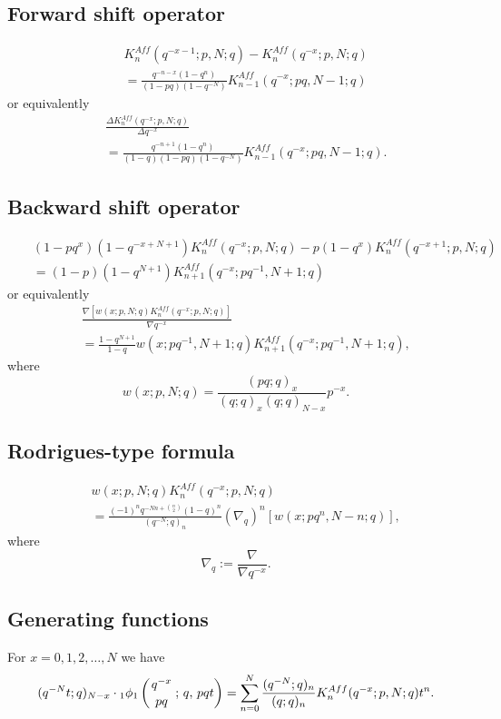 \documentclass[envcountchap,graybox]{svmono}
\newcommand{\qhyp}[5]{\mbox{}_{#1}{\phi}_{#2}
\left(\genfrac{}{}{0pt}{}{#3}{#4}\,;\,q,\,#5\right)}
\newcommand{\qhyp}[5]{\,\mbox{}_{#1}\phi_{#2}\!\left(
  \genfrac{}{}{0pt}{}{#3}{#4};#5\right)}
\begin{document}
\subsection*{Forward shift operator}
\begin{eqnarray}
\label{shift1AffqKrawtchoukI}
& &K_n^{Aff}(q^{-x-1};p,N;q)-K_n^{Aff}(q^{-x};p,N;q)\nonumber\\
& &{}=\frac{q^{-n-x}(1-q^n)}{(1-pq)(1-q^{-N})}K_{n-1}^{Aff}(q^{-x};pq,N-1;q)
\end{eqnarray}
or equivalently
\begin{eqnarray}
\label{shift1AffqKrawtchoukII}
& &\frac{\Delta K_n^{Aff}(q^{-x};p,N;q)}{\Delta q^{-x}}\nonumber\\
& &{}=\frac{q^{-n+1}(1-q^n)}{(1-q)(1-pq)(1-q^{-N})}K_{n-1}^{Aff}(q^{-x};pq,N-1;q).
\end{eqnarray}

\subsection*{Backward shift operator}
\begin{eqnarray}
\label{shift2AffqKrawtchoukI}
& &(1-pq^x)(1-q^{-x+N+1})K_n^{Aff}(q^{-x};p,N;q)-p(1-q^x)K_n^{Aff}(q^{-x+1};p,N;q)\nonumber\\
& &{}=(1-p)(1-q^{N+1})K_{n+1}^{Aff}(q^{-x};pq^{-1},N+1;q)
\end{eqnarray}
or equivalently
\begin{eqnarray}
\label{shift2AffqKrawtchoukII}
& &\frac{\nabla\left[w(x;p,N;q)K_n^{Aff}(q^{-x};p,N;q)\right]}{\nabla q^{-x}}\nonumber\\
& &{}=\frac{1-q^{N+1}}{1-q}w(x;pq^{-1},N+1;q)K_{n+1}^{Aff}(q^{-x};pq^{-1},N+1;q),
\end{eqnarray}
where
$$w(x;p,N;q)=\frac{(pq;q)_x}{(q;q)_x(q;q)_{N-x}}p^{-x}.$$

\subsection*{Rodrigues-type formula}
\begin{eqnarray}
\label{RodAffqKrawtchouk}
& &w(x;p,N;q)K_n^{Aff}(q^{-x};p,N;q)\nonumber\\
& &{}=\frac{(-1)^nq^{-Nn+\binom{n}{2}}(1-q)^n}{(q^{-N};q)_n}\left(\nabla_q\right)^n\left[w(x;pq^n,N-n;q)\right],
\end{eqnarray}
where
$$\nabla_q:=\frac{\nabla}{\nabla q^{-x}}.$$

\subsection*{Generating functions} For $x=0,1,2,\ldots,N$ we have
\begin{equation}
\label{GenAffqKrawtchouk1}
(q^{-N}t;q)_{N-x}\cdot\qhyp{1}{1}{q^{-x}}{pq}{pqt}=\sum_{n=0}^N
\frac{(q^{-N};q)_n}{(q;q)_n}K_n^{Aff}(q^{-x};p,N;q)t^n.
\end{equation}
\end{document}
